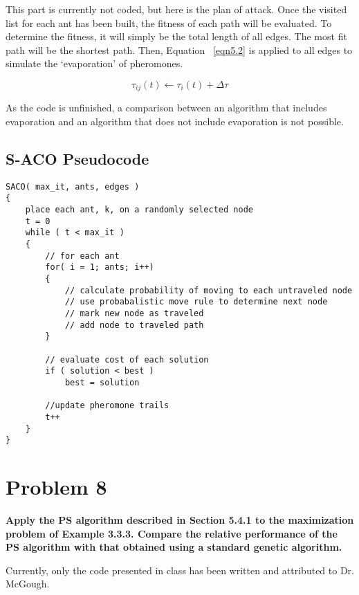 This part is currently not coded, but here is the plan of attack. Once the visited list for each ant has been built, the fitness of each path will be evaluated. To determine the fitness, it will simply be the total length of all edges. The most fit path will be the shortest path. Then, Equation ~\ref{eqn5.2} is applied to all edges to simulate the `evaporation' of pheromones. 

\begin{equation} \label{eqn5.2}
\tau_{ij}(t) \leftarrow \tau_i(t) + \Delta \tau
\end{equation}

As the code is unfinished, a comparison between an algorithm that includes evaporation and an algorithm that does not include evaporation is not possible.

\subsection{ S-ACO Pseudocode } \label{acoPseudo}
\begin{lstlisting}
SACO( max_it, ants, edges )
{
	place each ant, k, on a randomly selected node
	t = 0
	while ( t < max_it )
	{
		// for each ant
		for( i = 1; ants; i++)
		{
			// calculate probability of moving to each untraveled node
			// use probabalistic move rule to determine next node
			// mark new node as traveled
			// add node to traveled path
		}
		
		// evaluate cost of each solution
		if ( solution < best )
			best = solution

		//update pheromone trails
		t++
	}
}
\end{lstlisting}


\section{ Problem 8 }
\textbf{Apply the PS algorithm described in Section 5.4.1 to the maximization problem of Example 3.3.3. Compare the relative performance of the PS algorithm with that obtained using a standard genetic algorithm.}

Currently, only the code presented in class has been written and attributed to Dr. McGough.